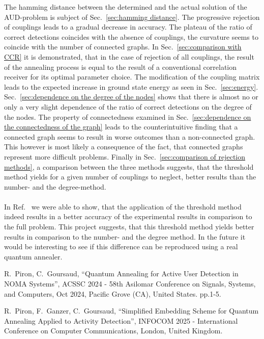 \documentclass{article}
\begin{document}
The hamming distance between the determined and the actual solution of the AUD-problem is subject of Sec.~\ref{sec:hamming distance}. The progressive rejection of couplings leads to a gradual decrease in accuracy. The plateau of the ratio of correct detections coincides with the absence of couplings, the curvature seems to coincide with the number of connected graphs. In Sec.~\ref{sec:comparison with CCR} it is demonstrated, that in the case of rejection of all couplings, the result of the annealing process is equal to the result of a conventional correlation receiver for its optimal parameter choice. The modification of the coupling matrix leads to the expected increase in ground state energy as seen in Sec.~\ref{sec:energy}. Sec.~\ref{sec:dependence on the degree of the nodes} shows that there is almost no or only a very slight dependence of the ratio of correct detections on the degree of the nodes. The property of connectedness examined in Sec.~\ref{sec:dependence on the connectedness of the graph} leads to the counterintuitive finding that a connected graph seems to result in worse outcomes than a non-connected graph. This however is most likely a consequence of the fact, that connected graphs represent more difficult problems. Finally in Sec.~\ref{sec:comparison of rejection methods}, a comparison between the three methods suggests, that the threshold method yields for a given number of couplings to neglect, better results than the number- and the degree-method.
\\\\
In Ref.~\cite{PirGanGou25} we were able to show, that the application of the threshold method indeed results in a better accuracy of the experimental results in comparison to the full problem. This project suggests, that this threshold method yields better results in comparison to the number- and the degree method. In the future it would be interesting to see if this difference can be reproduced using a real quantum annealer. 
	
	
\begin{thebibliography}{9}
	R.~Piron, C.~Goursaud, ``Quantum Annealing for Active User Detection in NOMA Systems'', ACSSC 2024 - 58th Asilomar Conference on Signals, Systems, and Computers, Oct 2024, Pacific Grove
	(CA), United States. pp.1-5. 
	
	R.~Piron, F.~Ganzer, C.~Goursaud, ``Simplified Embedding Scheme for Quantum
	Annealing Applied to Activity Detection'', INFOCOM 2025 - International Conference on Computer Communications, London, United Kingdom.
\end{thebibliography}
	
	
\end{document}
